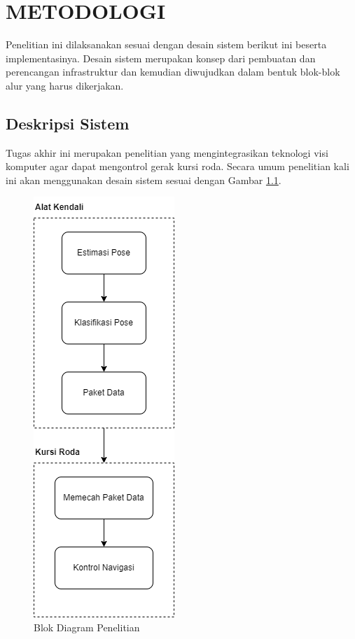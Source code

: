 \chapter{METODOLOGI}
\label{chap:metodologi}


Penelitian ini dilaksanakan sesuai dengan desain sistem berikut ini beserta implementasinya. Desain sistem merupakan konsep dari pembuatan dan perencangan infrastruktur dan kemudian diwujudkan dalam bentuk blok-blok alur yang harus dikerjakan.

\section{Deskripsi Sistem}
\label{sec:deskripsisistem}

Tugas akhir ini merupakan penelitian yang mengintegrasikan teknologi visi komputer agar dapat mengontrol gerak kursi roda. Secara umum penelitian kali ini akan menggunakan desain sistem sesuai dengan Gambar \ref{fig:Metodologi Penelitian}.

\begin{figure} [ht] \centering
    \includegraphics[scale=0.68]{gambar/blokDiagram.png}
    \caption{Blok Diagram Penelitian}
    \label{fig:Metodologi Penelitian}
\end{figure}

